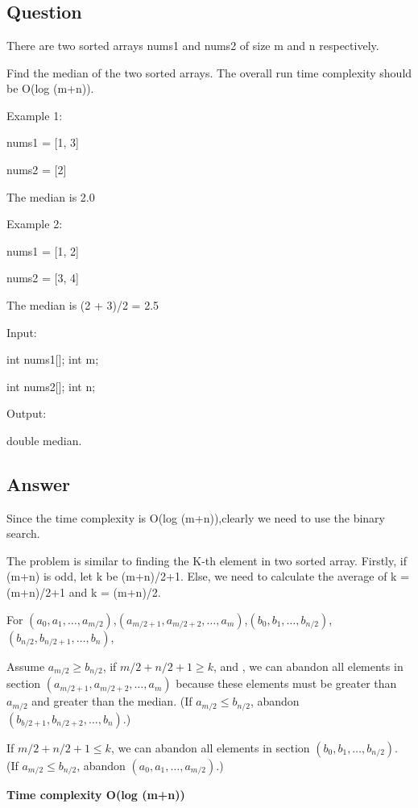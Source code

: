 \section{}
\subsection{Question}
There are two sorted arrays nums1 and nums2 of size m and n respectively.

Find the median of the two sorted arrays. The overall run time complexity should be O(log (m+n)).

Example 1:

nums1 = [1, 3]

nums2 = [2]

The median is 2.0

Example 2:

nums1 = [1, 2]

nums2 = [3, 4]

The median is (2 + 3)/2 = 2.5

Input:

int nums1[]; int m;

int nums2[]; int n;

Output:

double median.

\subsection{Answer}
Since the time complexity is O(log (m+n)),clearly we need to use the binary search.

The problem is similar to finding the K-th element in two sorted array. Firstly, if (m+n) is odd, let k be (m+n)/2+1. Else, we need to calculate the average of k = (m+n)/2+1 and k = (m+n)/2.

For $(a_0,a_1,\ldots,a_{m/2})$,$(a_{m/2+1},a_{m/2+2},\ldots,a_{m})$,$(b_0,b_1,\ldots,b_{n/2})$,$(b_{n/2},b_{n/2+1},\ldots,b_{n})$,

Assume $a_{m/2} \ge b_{n/2}$,
if $m/2+n/2+1 \ge k$, and , we can abandon all elements in section $(a_{m/2+1},a_{m/2+2},\ldots,a_{m})$ because these elements must be greater than $a_{m/2}$ and greater than the median. (If $a_{m/2} \leq b_{n/2}$, abandon $(b_{b/2+1},b_{n/2+2},\ldots,b_{n})$.)

If $m/2+n/2+1 \leq k$, we can abandon all elements in section $(b_{0},b_{1},\ldots,b_{n/2})$. (If $a_{m/2} \leq b_{n/2}$, abandon $(a_{0},a_{1},\ldots,a_{m/2})$.)

\textbf{\color{red}Time complexity O(log (m+n))}
\newpage
